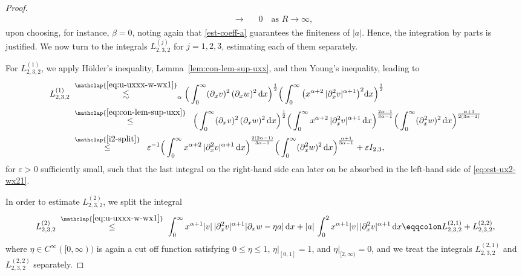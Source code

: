 \documentclass[reqno,12pt]{amsart}
\renewcommand{\d}{\ensuremath{\mathrm{d}}}
\newcommand{\eps}{\ensuremath{\varepsilon}}
\renewcommand{\d}{\ensuremath{{\rm d}}}
\numberwithin{equation}{section}
\begin{document}
\begin{proof}
\begin{align*}
& \quad \to_{\phantom{\alpha,\beta}} \; 0 \quad \text{as } R \to \infty,
\end{align*}
%
upon choosing, for instance, $\beta = 0$, noting again that \eqref{est-coeff-a} guarantees the finiteness of $|a|$. Hence, the integration by parts is justified. We now turn to the integrals $L_{2,3,2}^{(j)}$ for $j=1,2,3$, estimating each of them separately.

%
\bigskip
%

For $L_{2,3,2}^{(1)}$, we apply H\"older's inequality, Lemma~\ref{lem:con-lem-sup-uxx}, and then Young's inequality, leading to 
%
\begin{align} \label{eq:est-xux-uxx-wx}
    L_{2,3,2}^{(1)} 
    \; &\stackrel{\mathclap{\eqref{eq:u-uxxx-w-wx1}}}{\lesssim}_{\alpha} \Big(\int_0^\infty (\partial_x v)^2\,(\partial_x w)^2 \, \d x \Big)^{\frac{1}{2}} 
    \Big(\int_0^\infty \big(x^{\alpha+2}\, |\partial_x^2 v|^{\alpha+1}\big)^2 \d x\Big)^\frac{1}{2} \nonumber 
    \\
    &\stackrel{\mathclap{\eqref{eq:con-lem-sup-uxx}}}{\le}_{\phantom{\alpha}} \Big(\int_0^\infty (\partial_x v)^2\,(\partial_x w)^2 \, \d x \Big)^{\frac{1}{2}} 
    \Big(\int_0^\infty x^{\alpha +2} \, |\partial_x^2 v|^{\alpha +1} \, \d x\Big)^{\frac{2\alpha-1}{3\alpha-1}}
    \Big( \int_0^\infty (\partial_x^2 w)^2 \, \d x\Big)^{\frac{\alpha+1}{2(3\alpha-1)}} \nonumber \\
    &\stackrel{\mathclap{\eqref{i2-split}}}{\leq}_{\phantom{\alpha}}
    \eps^{-1} \Big(\int_0^\infty x^{\alpha +2} \, |\partial_x^2 v|^{\alpha +1} \, \d x\Big)^{\frac{2(2\alpha-1)}{3\alpha-1}}
    \Big(\int_0^\infty (\partial_x^2 w)^2 \, \d x\Big)^{\frac{\alpha+1}{3\alpha-1}} + \eps I_{2,3}, 
\end{align}
%
for $\eps > 0$ sufficiently small, such that the last integral on the right-hand side can later on be absorbed in the left-hand side of \eqref{eq:est-ux2-wx21}.

%
\bigskip
%

In order to estimate $L_{2,3,2}^{(2)}$,  we split the integral
\begin{equation*}
   L_{2,3,2}^{(2)}
    \; \stackrel{\mathclap{\eqref{eq:u-uxxx-w-wx1}}}{\leq} \;
    \int_0^\infty x^{\alpha+1} |v|\, |\partial_x^2 v|^{\alpha+1} |\partial_x w - \eta a|\, \d x
    +
    |a|\, \int_0^2 x^{\alpha+1} |v|\, |\partial_x^2 v|^{\alpha+1}\, \d x
    \eqqcolon 
    L_{2,3,2}^{(2,1)}+ L_{2,3,2}^{(2,2)}, 
\end{equation*}
where $\eta \in C^\infty([0,\infty))$ is again a cut off function satisfying $0 \le \eta \le 1$, $\eta|_{[0,1]} = 1$, and $\eta|_{[2,\infty)} = 0$, and we treat the integrals $ L_{2,3,2}^{(2,1)}$ and $ L_{2,3,2}^{(2,2)}$ separately. 


\end{proof}
\end{document}
